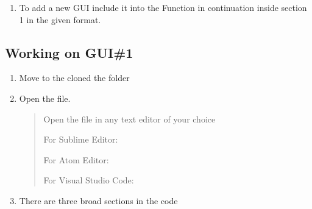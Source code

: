 \documentclass[letterpaper,10pt,english]{sphinxmanual}
\begin{document}
\begin{enumerate}
%
\setcounter{enumi}{3}
\item {} 
To add a new GUI include it into the Function in continuation inside section 1 in the given format.

\end{enumerate}

\begin{sphinxVerbatim}[commandchars=\\\{\}]
 
\end{sphinxVerbatim}


\subsection{Working on GUI\#1}
\label{\detokenize{developer:working-on-gui-1}}\begin{enumerate}
%
\item {} 
Move to the cloned the folder
\begin{quote}

\begin{sphinxVerbatim}[commandchars=\\\{\}]
 
\end{sphinxVerbatim}
\end{quote}

\item {} 
Open the  file.
\begin{quote}

Open the  file in any text editor of your choice

For Sublime Editor:

\begin{sphinxVerbatim}[commandchars=\\\{\}]
 
\end{sphinxVerbatim}

For Atom Editor:

\begin{sphinxVerbatim}[commandchars=\\\{\}]
 
\end{sphinxVerbatim}

For Visual Studio Code:

\begin{sphinxVerbatim}[commandchars=\\\{\}]
 
\end{sphinxVerbatim}
\end{quote}

\item {} 
There are three broad sections in the code

\end{enumerate}
\end{document}
